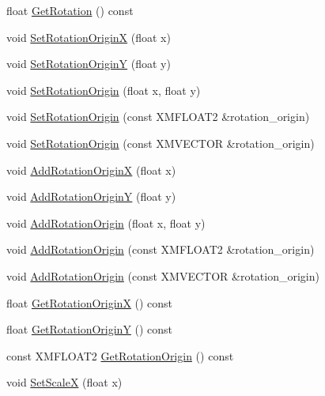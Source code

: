 \begin{DoxyCompactItemize}
\item 
float \hyperlink{structmage_1_1_sprite_transform_a1dda0fe10496d0d04a660c84d9a87efe}{Get\+Rotation} () const
\item 
void \hyperlink{structmage_1_1_sprite_transform_a8b41bee9010d31027b2c1c40b393a4f5}{Set\+Rotation\+OriginX} (float x)
\item 
void \hyperlink{structmage_1_1_sprite_transform_affd054e4f5602930b84a21b1637b657a}{Set\+Rotation\+OriginY} (float y)
\item 
void \hyperlink{structmage_1_1_sprite_transform_a48e720840181b0da09989b739102c294}{Set\+Rotation\+Origin} (float x, float y)
\item 
void \hyperlink{structmage_1_1_sprite_transform_ab8eb3ba0c307d8267486f016da679e3e}{Set\+Rotation\+Origin} (const X\+M\+F\+L\+O\+A\+T2 \&rotation\+\_\+origin)
\item 
void \hyperlink{structmage_1_1_sprite_transform_a42d238a6a6d43bfa899eda7c6714c9b6}{Set\+Rotation\+Origin} (const X\+M\+V\+E\+C\+T\+OR \&rotation\+\_\+origin)
\item 
void \hyperlink{structmage_1_1_sprite_transform_a2ee0eacdef5904f5f95ec5dd306bb56e}{Add\+Rotation\+OriginX} (float x)
\item 
void \hyperlink{structmage_1_1_sprite_transform_a47808a3521d3c083b3fd0203fbd21b5c}{Add\+Rotation\+OriginY} (float y)
\item 
void \hyperlink{structmage_1_1_sprite_transform_a70a7fa7de4a563e4093400c3f60effbe}{Add\+Rotation\+Origin} (float x, float y)
\item 
void \hyperlink{structmage_1_1_sprite_transform_a16689c2da63a2b59186950cb9936d695}{Add\+Rotation\+Origin} (const X\+M\+F\+L\+O\+A\+T2 \&rotation\+\_\+origin)
\item 
void \hyperlink{structmage_1_1_sprite_transform_a4cc39dc0d2a36afa4d1112541af7d611}{Add\+Rotation\+Origin} (const X\+M\+V\+E\+C\+T\+OR \&rotation\+\_\+origin)
\item 
float \hyperlink{structmage_1_1_sprite_transform_abf3a72d9f594aa157608070d69f4428e}{Get\+Rotation\+OriginX} () const
\item 
float \hyperlink{structmage_1_1_sprite_transform_a0f6056a96c419817211efce6687e1d89}{Get\+Rotation\+OriginY} () const
\item 
const X\+M\+F\+L\+O\+A\+T2 \hyperlink{structmage_1_1_sprite_transform_a8adc22a8d6c32d1b2a49ac78707262f9}{Get\+Rotation\+Origin} () const
\item 
void \hyperlink{structmage_1_1_sprite_transform_a90394102afd9d31dd426668aea210ed0}{Set\+ScaleX} (float x)

\end{DoxyCompactItemize}

